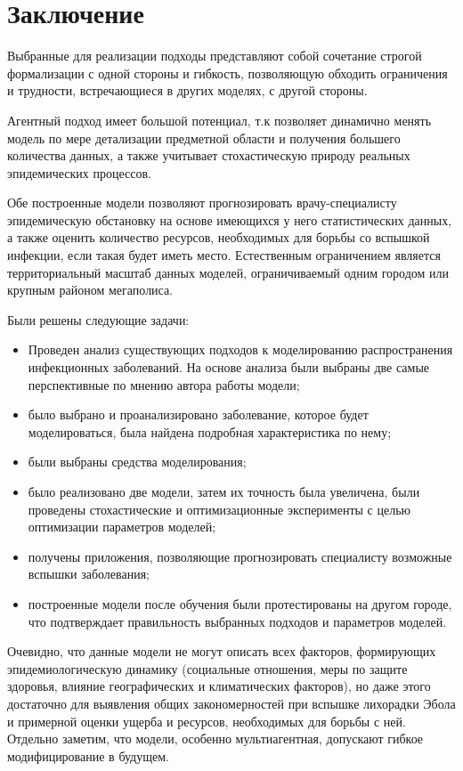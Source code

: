 \newpage
\parindent=1cm %
\section*{Заключение} %

Выбранные для реализации подходы представляют собой сочетание строгой формализации с одной стороны и гибкость, позволяющую обходить ограничения и трудности, встречающиеся в других моделях, с другой стороны. 

Агентный подход имеет большой потенциал, т.к позволяет динамично менять модель по мере детализации предметной области и получения большего количества данных, а также учитывает стохастическую природу реальных эпидемических процессов.

Обе построенные модели позволяют прогнозировать врачу-специалисту эпидемическую обстановку на основе имеющихся у него статистических данных, а также оценить количество ресурсов, необходимых для борьбы со вспышкой инфекции, если такая будет иметь место. Естественным ограничением является территориальный масштаб данных моделей, ограничиваемый одним городом или крупным районом мегаполиса.

Были решены следующие задачи:
\begin{itemize}
	\item Проведен анализ существующих подходов к моделированию распространения инфекционных заболеваний. На основе анализа были выбраны две самые перспективные по мнению автора работы модели;
	\item было выбрано и проанализировано заболевание, которое будет моделироваться, была найдена подробная характеристика по нему;
	\item были выбраны средства моделирования;
	\item было реализовано две модели, затем их точность была увеличена, были проведены стохастические и оптимизационные эксперименты с целью оптимизации параметров моделей;
	\item получены приложения, позволяющие прогнозировать специалисту возможные вспышки заболевания;
	\item построенные модели после обучения были протестированы на другом городе, что подтверждает правильность выбранных подходов и параметров моделей.
\end{itemize}

Очевидно, что данные модели не могут описать всех факторов, формирующих эпидемиологическую динамику (социальные отношения, меры по защите здоровья, влияние географических и климатических факторов), но даже этого достаточно для выявления общих закономерностей при вспышке лихорадки Эбола и примерной оценки ущерба и ресурсов, необходимых для борьбы с ней. Отдельно заметим, что модели, особенно мультиагентная, допускают гибкое модифицирование в будущем. 